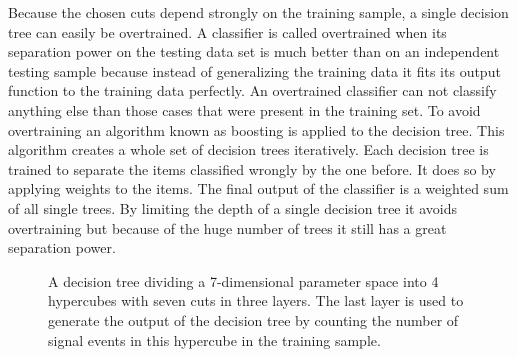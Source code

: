 Because the chosen cuts depend strongly on the training sample, a single decision tree can easily be overtrained. A classifier is called overtrained when its separation power on the testing data set is much better than on an independent testing sample because instead of generalizing the training data it fits its output function to the training data perfectly. An overtrained classifier can not classify anything else than those cases that were present in the training set. To avoid overtraining an algorithm known as boosting is applied to the decision tree. This algorithm creates a whole set of decision trees iteratively. Each decision tree is trained to separate the items classified wrongly by the one before. It does so by applying weights to the items. The final output of the classifier is a weighted sum of all single trees. By limiting the depth of a single decision tree it avoids overtraining but because of the huge number of trees it still has a great separation power.

\begin{figure}
  \centering
\caption[Decision Tree.]{A decision tree dividing a 7-dimensional parameter space into 4 hypercubes with seven cuts in three layers. The last layer is used to generate the output of the decision tree by counting the number of signal events in this hypercube in the training sample.}
\label{fig-decision-tree}
\end{figure}


